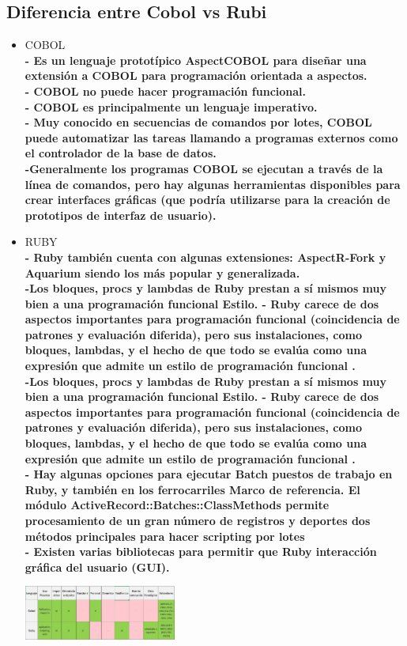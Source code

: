 \documentclass[twoside,twocolumn]{article}
\begin{document}
\subsection{Diferencia entre Cobol vs Rubi}
\begin{itemize}
\item COBOL
\\ \textbf{- Es un lenguaje prototípico AspectCOBOL para diseñar una extensión a COBOL para programación orientada a aspectos.}
\\ \textbf{- COBOL no puede hacer programación funcional.}
\\ \textbf{- COBOL es principalmente un lenguaje imperativo. }
\\ \textbf{- Muy conocido en secuencias de comandos por lotes, COBOL puede automatizar las tareas llamando a programas externos
como el controlador de la base de datos.}
\\ \textbf{-Generalmente los programas COBOL se ejecutan a través de
la línea de comandos, pero hay algunas herramientas
disponibles para crear interfaces gráficas (que
podría utilizarse para la creación de prototipos de interfaz de usuario).}
\item RUBY
\\ \textbf{- Ruby también cuenta con algunas extensiones:
AspectR-Fork y Aquarium siendo los más
popular y generalizada.}
\\ \textbf{-Los bloques, procs y lambdas de Ruby prestan
a sí mismos muy bien a una programación funcional
Estilo.
- Ruby carece de dos aspectos importantes para
programación funcional (coincidencia de patrones y
evaluación diferida), pero sus instalaciones, como
bloques, lambdas, y el hecho de que todo
se evalúa como una expresión que admite un
estilo de programación funcional
.}
\\ \textbf{-Los bloques, procs y lambdas de Ruby prestan
a sí mismos muy bien a una programación funcional
Estilo.
- Ruby carece de dos aspectos importantes para
programación funcional (coincidencia de patrones y
evaluación diferida), pero sus instalaciones, como
bloques, lambdas, y el hecho de que todo
se evalúa como una expresión que admite un
estilo de programación funcional
.}
\\ \textbf{-  Hay algunas opciones para ejecutar Batch
puestos de trabajo en Ruby, y también en los ferrocarriles
Marco de referencia. El módulo
ActiveRecord::Batches::ClassMethods permite
procesamiento de un gran número de registros y deportes
dos métodos principales para hacer scripting por lotes}
\\ \textbf{- Existen varias bibliotecas para permitir que Ruby
interacción gráfica del usuario (GUI).
}
\begin{center}
	\includegraphics[width=5cm]{./Imagenes/Diferencias} 
	\end{center}
\end{itemize}
\end{document}

